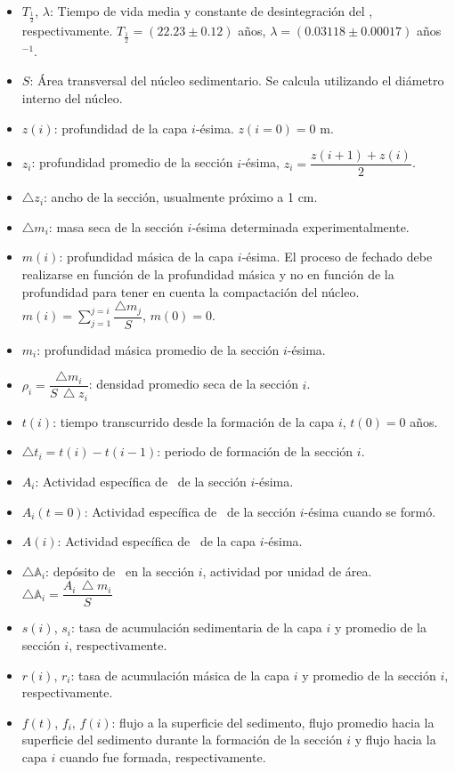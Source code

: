 \begin{itemize}
\item $T_{\frac{1}{2}}$, $\lambda$: Tiempo de vida media y constante de desintegración del \PbCero, respectivamente. $T_{\frac{1}{2}} = (22.23 \pm 0.12)$ años, $\lambda = (0.03118 \pm 0.00017)$ años$^{-1}$.
\item $S$: Área transversal del núcleo sedimentario. Se calcula utilizando el diámetro interno del núcleo. 
\item $z(i)$: profundidad de la capa $i$-ésima. $z(i=0)=0$ m. 
\item $z_i$: profundidad promedio de la sección $i$-ésima, $z_i = \dfrac{z(i+1)+z(i)}{2}$. 
\item $\bigtriangleup z_i$: ancho de la sección, usualmente próximo a 1 cm. 
\item $\bigtriangleup m_i$: masa seca de la sección $i$-ésima determinada experimentalmente. 
\item $m(i)$: profundidad másica de la capa $i$-ésima. El proceso de fechado debe realizarse en función de la profundidad másica y no en función de la profundidad para tener en cuenta la compactación  del núcleo. $m(i) = \displaystyle \sum_{j=1}^{j=i} \dfrac{\bigtriangleup m_j}{S}$, $m(0) = 0$.
\item $m_i$: profundidad másica promedio de la sección $i$-ésima. 
\item $\rho_i = \dfrac{\bigtriangleup m_i}{S\, \bigtriangleup z_i}$: densidad promedio seca de la sección $i$. 
\item $t(i)$: tiempo transcurrido desde la formación de la capa $i$, $t(0)=0$ años.
\item $\bigtriangleup t_i = t(i) - t(i-1)$: periodo de formación de la sección $i$. 
\item $A_i$: Actividad específica de \PbCeroEx\, de la sección $i$-ésima. 
\item $A_i (t=0)$: Actividad específica de \PbCeroEx\, de la sección $i$-ésima cuando se formó. 
\item $A(i)$: Actividad específica de \PbCeroEx\, de la capa $i$-ésima. 
\item $\bigtriangleup \mathbb{A}_i$: depósito de \PbCeroEx\, en la sección $i$, actividad por unidad de área. $\bigtriangleup \mathbb{A}_i = \dfrac{A_i\,\bigtriangleup m_i}{S}$
\item $s(i)$, $s_i$: tasa de acumulación sedimentaria de la capa $i$ y promedio de la sección $i$, respectivamente. 
\item $r(i)$, $r_i$: tasa de acumulación másica de la capa $i$ y promedio de la sección $i$, respectivamente. 
\item $f(t)$, $f_i$, $f(i)$: flujo a la superficie del sedimento, flujo promedio hacia la superficie del sedimento durante la formación de la sección $i$ y flujo hacia la capa $i$ cuando fue formada, respectivamente. 
\end{itemize}
